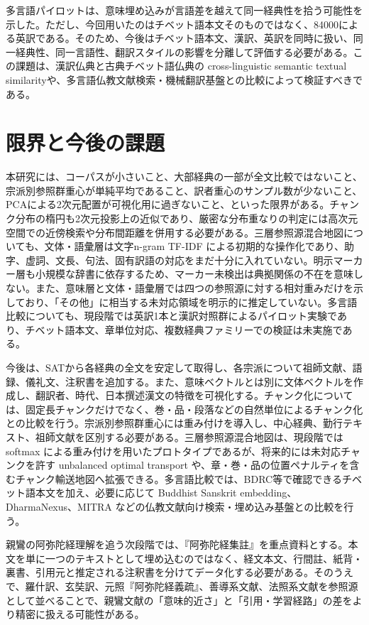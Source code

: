 \documentclass[uplatex,dvipdfmx,11pt,a4paper]{jsarticle}
\begin{document}
多言語パイロットは、意味埋め込みが言語差を越えて同一経典性を拾う可能性を示した。ただし、今回用いたのはチベット語本文そのものではなく、84000による英訳である。そのため、今後はチベット語本文、漢訳、英訳を同時に扱い、同一経典性、同一言語性、翻訳スタイルの影響を分離して評価する必要がある。この課題は、漢訳仏典と古典チベット語仏典の cross-linguistic semantic textual similarity\cite{felbur2022}や、多言語仏教文献検索・機械翻訳基盤\cite{mitra2026}との比較によって検証すべきである。

\section{限界と今後の課題}

本研究には、コーパスが小さいこと、大部経典の一部が全文比較ではないこと、宗派別参照群重心が単純平均であること、訳者重心のサンプル数が少ないこと、PCAによる2次元配置が可視化用に過ぎないこと、といった限界がある。チャンク分布の楕円も2次元投影上の近似であり、厳密な分布重なりの判定には高次元空間での近傍検索や分布間距離を併用する必要がある。三層参照源混合地図についても、文体・語彙層は文字n-gram TF-IDF による初期的な操作化であり、助字、虚詞、文長、句法、固有訳語の対応をまだ十分に入れていない。明示マーカー層も小規模な辞書に依存するため、マーカー未検出は典拠関係の不在を意味しない。また、意味層と文体・語彙層では四つの参照源に対する相対重みだけを示しており、「その他」に相当する未対応領域を明示的に推定していない。多言語比較についても、現段階では英訳1本と漢訳対照群によるパイロット実験であり、チベット語本文、章単位対応、複数経典ファミリーでの検証は未実施である。

今後は、SATから各経典の全文を安定して取得し、各宗派について祖師文献、語録、儀礼文、注釈書を追加する。また、意味ベクトルとは別に文体ベクトルを作成し、翻訳者、時代、日本撰述漢文の特徴を可視化する。チャンク化については、固定長チャンクだけでなく、巻・品・段落などの自然単位によるチャンク化との比較を行う。宗派別参照群重心には重み付けを導入し、中心経典、勤行テキスト、祖師文献を区別する必要がある。三層参照源混合地図は、現段階では softmax による重み付けを用いたプロトタイプであるが、将来的には未対応チャンクを許す unbalanced optimal transport や、章・巻・品の位置ペナルティを含むチャンク輸送地図へ拡張できる。多言語比較では、BDRC等で確認できるチベット語本文を加え、必要に応じて Buddhist Sanskrit embedding、DharmaNexus、MITRA などの仏教文献向け検索・埋め込み基盤との比較を行う。

親鸞の阿弥陀経理解を追う次段階では、『阿弥陀経集註』を重点資料とする。本文を単に一つのテキストとして埋め込むのではなく、経文本文、行間註、紙背・裏書、引用元と推定される注釈書を分けてデータ化する必要がある。そのうえで、羅什訳、玄奘訳、元照『阿弥陀経義疏』、善導系文献、法照系文献を参照源として並べることで、親鸞文献の「意味的近さ」と「引用・学習経路」の差をより精密に扱える可能性がある。
\end{document}
